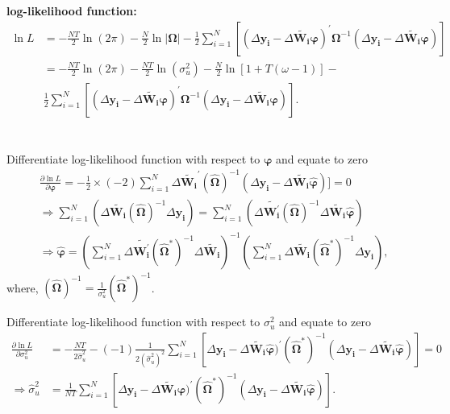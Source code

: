 \documentclass[12pt,a4paper,hyperref]{article}
\begin{document}
\textbf{log-likelihood function:} \\
\begin{align*}
\ln L & = -\frac{NT}{2} \ln (2\pi)-\frac{N}{2} \ln| \boldsymbol{\Omega}|-\frac{1}{2}\sum_{i=1}^{N}[(\Delta \boldsymbol{y_{i}}-\Delta \boldsymbol{\tilde{W_{i}}} \boldsymbol{\varphi})^{'}  \boldsymbol{\Omega}^{-1} (\Delta \boldsymbol{y_{i}}-\Delta \boldsymbol{\tilde{W_{i}}} \boldsymbol{\varphi})] \\
&= -\frac{NT}{2} \ln (2\pi)- \frac{NT}{2}\ln (\sigma^{2}_{u}) -\frac{N}{2} \ln[1+T(\omega-1)]- \\
&\frac{1}{2} \sum_{i=1}^{N}[(\Delta \boldsymbol{y_{i}}-\Delta \boldsymbol{\tilde{W_{i}}} \boldsymbol{\varphi})^{'}  \boldsymbol{\Omega}^{-1} (\Delta \boldsymbol{y_{i}}-\Delta \boldsymbol{\tilde{W_{i}}} \boldsymbol{\varphi})].
\end{align*}
\\ \\
Differentiate log-likelihood function with respect to $\boldsymbol{\varphi}$ and equate to zero
\begin{align*}
&\frac{\partial \ln L}{\partial \boldsymbol{\varphi}}=-\frac{1}{2}\times (-2)  \sum_{i=1}^{N} \Delta \boldsymbol{\tilde{W_{i}}}^{'}  (\boldsymbol{\hat{\Omega}})^{-1} (\Delta \boldsymbol{y_{i}}-\Delta \boldsymbol{\tilde{W_{i}}} \boldsymbol{\hat{\varphi}})]=0 \\
&\Rightarrow  \sum_{i=1}^{N}(\Delta \boldsymbol{\tilde{W_{i}}} (\boldsymbol{\hat{\Omega}})^{-1} \Delta \boldsymbol{y_{i}})= \sum_{i=1}^{N}(\Delta \boldsymbol{\tilde{W_{i}^{'}}} (\boldsymbol{\hat{\Omega}})^{-1} \Delta \boldsymbol{\tilde{W_{i}}} \boldsymbol{\hat{\varphi}}) \\
& \Rightarrow  \boldsymbol{\hat{\varphi}}=(\sum_{i=1}^{N}\Delta \boldsymbol{\tilde{W_{i}^{'}}} (\boldsymbol{\hat{\Omega}^{*}})^{-1} \Delta \boldsymbol{\tilde{W_{i}}})^{-1}(\sum_{i=1}^{N}\Delta \boldsymbol{\tilde{W_{i}}} (\boldsymbol{\hat{\Omega}^{*}})^{-1} \Delta \boldsymbol{y_{i}}),
\end{align*}
where, $(\boldsymbol{\hat{\Omega}})^{-1}=\frac{1}{\sigma^{2}_{u}}(\boldsymbol{\hat{\Omega}^{*}})^{-1}$.


Differentiate log-likelihood function with respect to $\sigma^{2}_{u}$ and equate to zero
\begin{align*}
\frac{\partial \ln L}{\partial \sigma^{2}_{u}}&=-\frac{NT}{2\hat{\sigma}^{2}_{u}}-(-1)\frac{1}{2(\hat{\sigma}^{2}_{u})^{2}}
\sum_{i=1}^{N}[\Delta \boldsymbol{y_{i}}-\Delta \boldsymbol{\tilde{W_{i}}} \boldsymbol{\hat{\varphi}})^{'}  (\boldsymbol{\hat{\Omega}^{*}})^{-1} (\Delta \boldsymbol{y_{i}}-\Delta \boldsymbol{\tilde{W_{i}}} \boldsymbol{\hat{\varphi}})]=0 \\
\Rightarrow
\hat{\sigma}^{2}_{u}&=\frac{1}{NT} \sum_{i=1}^{N}[\Delta \boldsymbol{y_{i}}-\Delta \boldsymbol{\tilde{W_{i}}} \boldsymbol{\varphi})^{'}  (\boldsymbol{\hat{\Omega}^{*}})^{-1} (\Delta \boldsymbol{y_{i}}-\Delta \boldsymbol{\tilde{W_{i}}} \boldsymbol{\hat{\varphi}})].
\end{align*}
\end{document}

